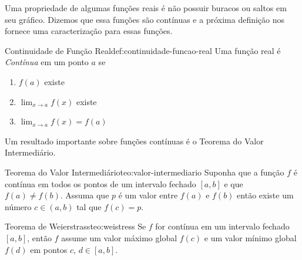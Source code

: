 Uma propriedade de algumas funções reais é não possuir buracos ou saltos em seu
gráfico. Dizemos que essa funções são contínuas e a próxima definição nos fornece
uma caracterização para essas funções.

\begin{definicao}{Continuidade de Função Real}{def:continuidade-funcao-real}
  Uma função real é \emph{Contínua} em um ponto $a$ se
  \begin{enumerate}[parsep=9pt]
    \item \( f(a) \) existe
    \item \( \lim_{x\to a} f(x) \) existe
    \item \( \lim_{x\to a} f(x) = f(a) \)
  \end{enumerate}
\end{definicao}

Um resultado importante sobre funções contínuas é o Teorema do Valor Intermediário.

\begin{teorema}{Teorema do Valor Intermediário}{teo:valor-intermediario}
  Suponha
  que a função $f$ é contínua em todos os pontos de um intervalo fechado
  $[a, b]$ e que \(f(a)\neq f(b)\). Assuma que $p$ é um valor entre $f(a)$ e $f(b)$
  então existe um número $c\in(a, b)$ tal que $f(c)=p$.
\end{teorema}

\begin{teorema}{Teorema de Weierstrass}{teo:weistress}
  Se
  $f$ for contínua em um intervalo fechado $[a, b]$, então $f$ assume um
  valor máximo global $f(c)$ e um valor mínimo global $f(d)$ em pontos
  $c$, $d \in[a, b]$.
\end{teorema}



